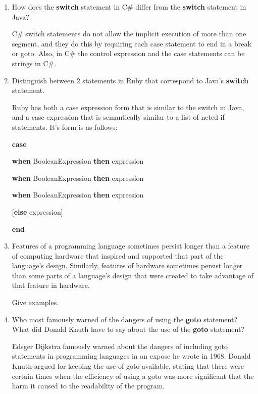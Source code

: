 \begin{enumerate}
  \item How does the \textbf{switch} statement in C\#
    differ from the \textbf{switch} statement in Java?

  \begin{answer}
    C\# switch statements do not allow the implicit execution of more than one segment, and they do this by requiring each case statement to end in a break or goto. Also, in C\# the control expression and the case statements can be strings in C\#.
  \end{answer}

  \item Distinguish between 2 statements in Ruby
    that correspond to Java's \textbf{switch} statement.

  \begin{answer}
   Ruby has both a case expression form that is similar to the switch in Java, and a case expression that is semantically similar to a list of neted if statements. It's form is as follows:

   \textbf{case}

   \textbf{when} BooleanExpression \textbf{then} expression

   \textbf{when} BooleanExpression \textbf{then} expression

   \textbf{when} BooleanExpression \textbf{then} expression

   [\textbf{else} expression]

   \textbf{end}

  \end{answer}


  \item Features of a programming language sometimes persist
    longer than a feature of computing hardware that inspired
    and supported that part of the language's design.
    Similarly, features of hardware sometimes persist longer
    than some parts of a language's design that were created
    to take advantage of that feature in hardware.

    Give examples.

  \begin{answer}
   
  \end{answer}

  \item Who most famously warned of the dangers of using the
    \textbf{goto} statement? What did Donald Knuth have to
    say about the use of the \textbf{goto} statement?

  \begin{answer}
   Edsger Dijkstra famously warned about the dangers of including goto statements in programming languages in an expose he wrote in 1968. Donald Knuth argued for keeping the use of goto available, stating that there were certain times when the efficiency of using a goto was more significant that the harm it caused to the readability of the program.
  \end{answer}


\end{enumerate}
